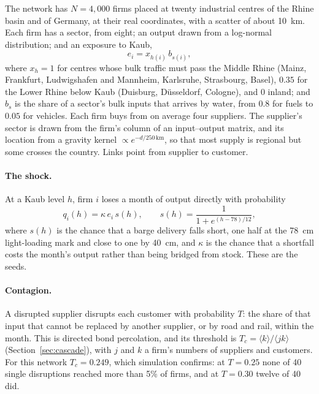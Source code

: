 \documentclass[11pt,a4paper]{article}
\theoremstyle{definition}
\theoremstyle{remark}
\newcommand{\avg}[1]{\langle #1 \rangle}
\begin{document}
The network has $N = 4{,}000$ firms placed at twenty industrial centres of the Rhine basin and of Germany, at their real coordinates, with a scatter of about 10~km. Each firm has a sector, from eight; an output drawn from a log-normal distribution; and an exposure to Kaub,
\begin{equation}
e_i = x_{h(i)}\, b_{s(i)},
\end{equation}
where $x_h = 1$ for centres whose bulk traffic must pass the Middle Rhine (Mainz, Frankfurt, Ludwigshafen and Mannheim, Karlsruhe, Strasbourg, Basel), $0.35$ for the Lower Rhine below Kaub (Duisburg, D\"usseldorf, Cologne), and $0$ inland; and $b_s$ is the share of a sector's bulk inputs that arrives by water, from $0.8$ for fuels to $0.05$ for vehicles. Each firm buys from on average four suppliers. The supplier's sector is drawn from the firm's column of an input--output matrix, and its location from a gravity kernel $\propto e^{-d/250\,\mathrm{km}}$, so that most supply is regional but some crosses the country. Links point from supplier to customer.

\paragraph{The shock.} At a Kaub level $h$, firm $i$ loses a month of output directly with probability
\begin{equation}
q_i(h) = \kappa\, e_i\, s(h), \qquad s(h) = \frac{1}{1 + e^{(h - 78)/12}} ,
\end{equation}
where $s(h)$ is the chance that a barge delivery falls short, one half at the 78~cm light-loading mark and close to one by 40~cm, and $\kappa$ is the chance that a shortfall costs the month's output rather than being bridged from stock. These are the seeds.

\paragraph{Contagion.} A disrupted supplier disrupts each customer with probability $T$: the share of that input that cannot be replaced by another supplier, or by road and rail, within the month. This is directed bond percolation, and its threshold is $T_c = \avg{k}/\avg{jk}$ (Section~\ref{sec:cascade}), with $j$ and $k$ a firm's numbers of suppliers and customers. For this network $T_c = 0.249$, which simulation confirms: at $T = 0.25$ none of 40 single disruptions reached more than 5\% of firms, and at $T = 0.30$ twelve of 40 did.
\end{document}
